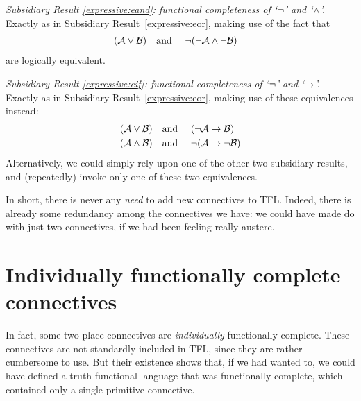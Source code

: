 \emph{Subsidiary Result \ref{expressive:eand}: functional completeness of `$\neg$' and `$\wedge$'.} Exactly as in Subsidiary Result~\ref{expressive:eor}, making use of the fact that
		\begin{align*}
		(\mathcal{A} \vee \mathcal{B}) & \text{\quad and \quad}\neg(\neg \mathcal{A} \wedge\neg \mathcal{B})
		\end{align*}
are logically equivalent.

\emph{Subsidiary Result \ref{expressive:eif}: functional completeness of `$\neg$' and `$\rightarrow$'.} Exactly as in Subsidiary Result~\ref{expressive:eor}, making use of these equivalences instead:
		\begin{align*}
		(\mathcal{A} \vee \mathcal{B}) &\text{\quad and \quad} (\neg \mathcal{A} \rightarrow \mathcal{B})\\
		(\mathcal{A} \wedge \mathcal{B}) &\text{\quad and \quad} \neg(\mathcal{A} \rightarrow \neg\mathcal{B})
		\end{align*}
Alternatively, we could simply rely upon one of the other two subsidiary results, and (repeatedly) invoke only one of these two equivalences.

In short, there is never any \emph{need} to add new connectives to TFL. Indeed, there is already some redundancy among the connectives we have: we could have made do with just two connectives, if we had been feeling really austere.

\section{Individually functionally complete connectives}

In fact, some two-place connectives are \emph{individually} functionally complete. These connectives are not standardly included in TFL, since they are rather cumbersome to use. But their existence shows that, if we had wanted to, we could have defined a truth-functional language that was functionally complete, which contained only a single primitive connective.

